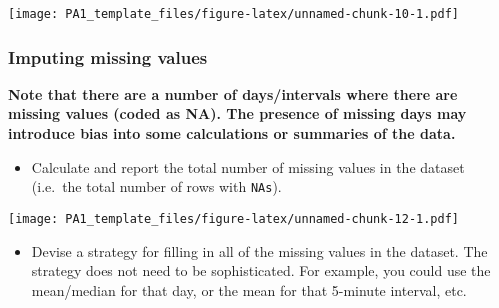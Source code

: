 \documentclass[
]{article}
\newenvironment{Shaded}{\begin{snugshade}}{\end{snugshade}}
\newcommand{\ControlFlowTok}[1]{\textcolor[rgb]{0.13,0.29,0.53}{\textbf{#1}}}
\newcommand{\DataTypeTok}[1]{\textcolor[rgb]{0.13,0.29,0.53}{#1}}
\newcommand{\KeywordTok}[1]{\textcolor[rgb]{0.13,0.29,0.53}{\textbf{#1}}}
\newcommand{\NormalTok}[1]{#1}
\newcommand{\OperatorTok}[1]{\textcolor[rgb]{0.81,0.36,0.00}{\textbf{#1}}}
\newcommand{\StringTok}[1]{\textcolor[rgb]{0.31,0.60,0.02}{#1}}
\providecommand{\tightlist}{%
  \setlength{\itemsep}{0pt}\setlength{\parskip}{0pt}}
\begin{document}
\texttt{[image: PA1\_template\_files/figure-latex/unnamed-chunk-10-1.pdf]}

\hypertarget{imputing-missing-values}{%
\subsubsection{Imputing missing values}\label{imputing-missing-values}}

\textbf{Note that there are a number of days/intervals where there are
missing values (coded as \color{red}{\verb|NA|}NA). The presence of
missing days may introduce bias into some calculations or summaries of
the data.}

\begin{itemize}
\tightlist
\item
  Calculate and report the total number of missing values in the dataset
  (i.e.~the total number of rows with
  \color{red}{\verb|NA|}\texttt{NAs}).
\end{itemize}

\begin{Shaded}
\end{Shaded}

\texttt{[image: PA1\_template\_files/figure-latex/unnamed-chunk-12-1.pdf]}

\begin{itemize}
\tightlist
\item
  Devise a strategy for filling in all of the missing values in the
  dataset. The strategy does not need to be sophisticated. For example,
  you could use the mean/median for that day, or the mean for that
  5-minute interval, etc.
\end{itemize}
\end{document}

